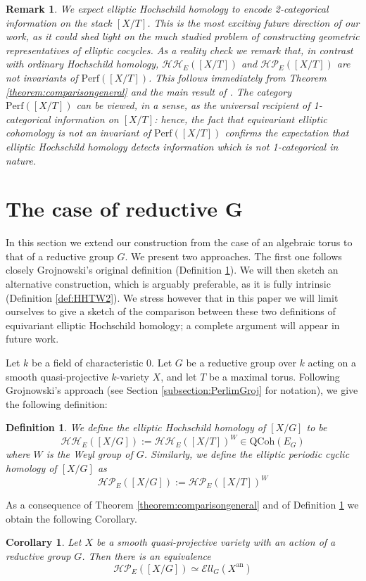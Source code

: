 \documentclass[11pt,letterpaper]{amsart}
\newtheorem{corollary}[dummy]{Corollary}
\newtheorem{definition}[dummy]{Definition}
\newtheorem{remark}[dummy]{Remark}
\newcommand{\cHH}{\mathcal{HH}}
\newcommand{\cHP}{\mathcal{HP}}
\newcommand{\El}{\mathcal{E}ll}
\newcommand{\an}{\mathrm{an}}
\newcommand{\Perf}{\mathrm{Perf}}
\newcommand{\QCoh}{\mathrm{QCoh}}
\begin{document}
\begin{remark}
We expect elliptic Hochschild homology to encode 2-categorical information on the stack $[X/T]$.   This is the most exciting future direction of our work, as it could shed light on the much studied problem of constructing geometric representatives of elliptic cocycles. As a  reality check we remark that, in contrast with ordinary Hochschild homology, $\cHH_E([X/T])$ and $\cHP_E([X/T])$  are \emph{not} invariants of $\Perf([X/T])$. This follows immediately from Theorem \ref{theorem:comparisongeneral} and the main result of \cite{SchSib}. The category $\Perf([X/T])$  can be viewed, in a sense, as the  universal recipient of 1-categorical information on $[X/T]$: hence, the fact that equivariant elliptic cohomology is not an invariant of $\Perf([X/T])$  confirms the expectation that elliptic Hochschild homology detects information which is not 1-categorical in nature.  
\end{remark}

\section{The case of reductive G} 
\label{sect:ReductiveG}
In this section we extend our construction from the case of an algebraic torus to that of a reductive group $G$. We present two approaches. The first one follows closely Grojnowski's original definition (Definition \ref{def:HHTW}). We will then sketch an alternative construction, which is arguably preferable, as it is fully intrinsic (Definition \ref{def:HHTW2}). We stress however that in this paper we will limit ourselves to give a sketch of the comparison between these two definitions of equivariant elliptic Hochschild homology; a complete argument will appear in future work.  

Let $k$ be a field of characteristic 0. Let $G$ be a reductive group over  $k$ acting on a smooth quasi-projective $k$-variety $X$, and let $T$ be a maximal torus. Following Grojnowski's approach (see Section \ref{subsection:PerlimGroj} for notation), we give the following definition:

\begin{definition}\label{def:HHTW}
We define the \emph{elliptic Hochschild homology} of $[X/G]$ to be
$$\cHH_E([X/G]):=\cHH_E([X/T])^W\in \QCoh(E_G)$$
where $W$ is the Weyl group of $G$.
Similarly, we define the \emph{elliptic periodic cyclic homology} of $[X/G]$ as
$$\cHP_E([X/G]):=\cHP_E([X/T])^W$$
\end{definition}
As a consequence of Theorem \ref{theorem:comparisongeneral} and of Definition \ref{def:HHTW} we obtain the following Corollary.
\begin{corollary}\label{cor:comparisonG}
Let $X$ be a smooth quasi-projective variety with an action of a reductive group $G$. 
Then there is an equivalence
$$\cHP_E([X/G])\simeq\El_G(X^\an)$$
\end{corollary}
\end{document}
